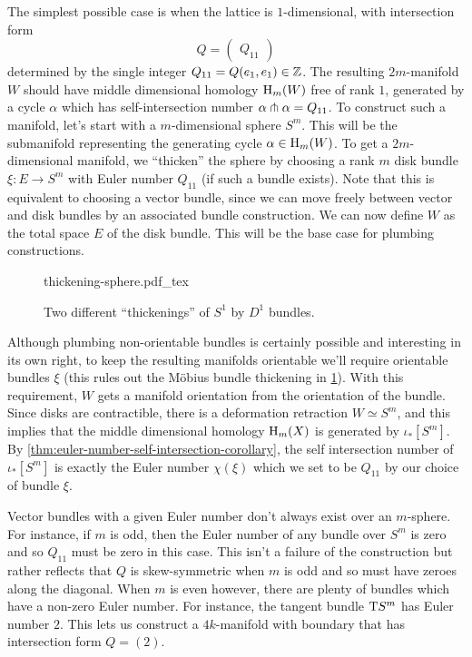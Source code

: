 The simplest possible case is when the lattice is $1$-dimensional, with intersection form
\[
	Q = \begin{pmatrix} Q_{11}\end{pmatrix}
\]
determined by the single integer $Q_{11}=Q(e_1,e_1)\in \mathbb{Z}$.
The resulting $2m$-manifold $W$ should have middle dimensional homology $\operatorname{H}_m(W)$ free of rank $1$, generated by a cycle $\alpha$ which has self-intersection number $\alpha\pitchfork \alpha = Q_{11}$. To construct such a manifold, let's start with a $m$-dimensional sphere $S^m$. This will be the submanifold representing the generating cycle $\alpha\in \operatorname{H}_m(W)$. To get a $2m$-dimensional manifold, we ``thicken'' the sphere by choosing a rank $m$ disk bundle $\xi : E \to S^m$ with Euler number $Q_{11}$ (if such a bundle exists). Note that this is equivalent to choosing a vector bundle, since we can move freely between vector and disk bundles by an associated bundle construction. We can now define $W$ as the total space $E$ of the disk bundle. This will be the base case for plumbing constructions.
\begin{figure}[ht]
	\centering
	{thickening-sphere.pdf_tex}
	\caption{Two different ``thickenings'' of $S^1$ by $D^1$ bundles.}\label{fig:thickening-sphere}
\end{figure}

Although plumbing non-orientable bundles is certainly possible and interesting in its own right, to keep the resulting manifolds orientable we'll require orientable bundles $\xi$ (this rules out the M\"obius bundle thickening in \cref{fig:thickening-sphere}). With this requirement, $W$ gets a manifold orientation from the orientation of the bundle.
Since disks are contractible, there is a deformation retraction $W\simeq S^m$, and this implies that the middle dimensional homology $\operatorname{H}_m(X)$ is generated by $\iota_*[S^m]$. By \cref{thm:euler-number-self-intersection-corollary}, the self intersection number of $\iota_*[S^m]$ is exactly the Euler number $\chi(\xi)$ which we set to be $Q_{11}$ by our choice of bundle $\xi$.

Vector bundles with a given Euler number don't always exist over an $m$-sphere. For instance, if $m$ is odd, then the Euler number of any bundle over $S^m$ is zero and so $Q_{11}$ must be zero in this case. This isn't a failure of the construction but rather reflects that $Q$ is skew-symmetric when $m$ is odd and so must have zeroes along the diagonal. When $m$ is even however, there are plenty of bundles which have a non-zero Euler number. For instance, the tangent bundle $\mathrm{T} S^m$ has Euler number $2$. This lets us construct a $4k$-manifold with boundary that has intersection form $Q = (2)$.

